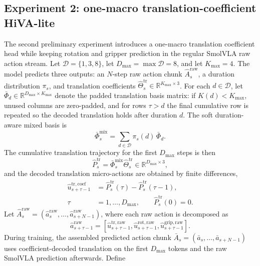 \documentclass[10pt,twocolumn,letterpaper]{article}
\begin{document}
\subsection{Experiment 2: one-macro translation-coefficient HiVA-lite}
\label{app:exp-one-macro-trans}
The second preliminary experiment introduces a one-macro translation coefficient head while keeping rotation and gripper prediction in the regular SmolVLA raw action stream. Let $\mathcal{D}=\{1,3,8\}$, let $D_{\max}=\max\mathcal{D}=8$, and let $K_{\max}=4$. The model predicts three outputs: an $N$-step raw action chunk $\hat A_s^{\mathrm{raw}}$, a duration distribution $\pi_s$, and translation coefficients $\hat\Theta_s^{\mathrm{tr}}\in\mathbb{R}^{K_{\max}\times 3}$. For each $d\in\mathcal{D}$, let $\bar\Phi_d\in\mathbb{R}^{D_{\max}\times K_{\max}}$ denote the padded translation basis matrix: if $K(d)<K_{\max}$, unused columns are zero-padded, and for rows $\tau>d$ the final cumulative row is repeated so the decoded translation holds after duration $d$. The soft duration-aware mixed basis is
\begin{equation}
\bar\Phi_s^{\mathrm{mix}}=
\sum_{d\in\mathcal{D}}\pi_s(d)\,\bar\Phi_d.
\end{equation}
The cumulative translation trajectory for the first $D_{\max}$ steps is then
\begin{equation}
\hat P_s^{\mathrm{tr}}=
\bar\Phi_s^{\mathrm{mix}}\hat\Theta_s^{\mathrm{tr}}
\in\mathbb{R}^{D_{\max}\times 3},
\end{equation}
and the decoded translation micro-actions are obtained by finite differences,
\begin{equation}
\begin{aligned}
\hat u_{s+\tau-1}^{\mathrm{tr,coef}}
&=\hat P_s^{\mathrm{tr}}(\tau)-\hat P_s^{\mathrm{tr}}(\tau-1),\\
\tau&=1,\ldots,D_{\max},
\qquad \hat P_s^{\mathrm{tr}}(0)=0.
\end{aligned}
\end{equation}
Let $\hat A_s^{\mathrm{raw}}=(\hat a_s^{\mathrm{raw}},\ldots,\hat a_{s+N-1}^{\mathrm{raw}})$, where each raw action is decomposed as
\begin{equation}
\hat a_{s+\tau-1}^{\mathrm{raw}}=
\left[
\hat u_{s+\tau-1}^{\mathrm{tr,raw}},
\hat u_{s+\tau-1}^{\mathrm{rot,raw}},
\hat u_{s+\tau-1}^{\mathrm{grip,raw}}
\right].
\end{equation}
During training, the assembled predicted action chunk $\bar A_s=(\bar a_s,\ldots,\bar a_{s+N-1})$ uses coefficient-decoded translation on the first $D_{\max}$ tokens and the raw SmolVLA prediction afterwards. Define
\end{document}
